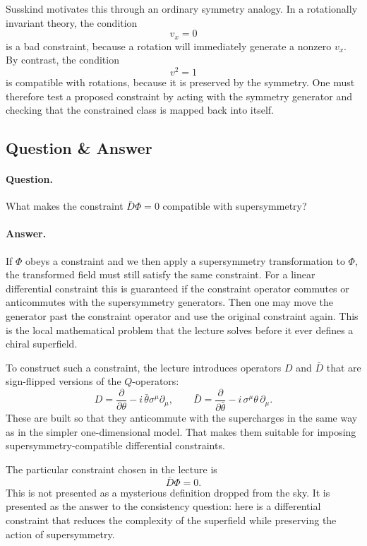 Susskind motivates this through an ordinary symmetry analogy. In a rotationally invariant theory, the condition
\[
v_x=0
\]
is a bad constraint, because a rotation will immediately generate a nonzero \(v_x\). By contrast, the condition
\[
v^2=1
\]
is compatible with rotations, because it is preserved by the symmetry. One must therefore test a proposed constraint by acting with the symmetry generator and checking that the constrained class is mapped back into itself.

\subsection{Question \& Answer}

\paragraph{Question.} What makes the constraint \(\bar D\Phi=0\) compatible with supersymmetry?

\paragraph{Answer.} If \(\Phi\) obeys a constraint and we then apply a supersymmetry transformation to \(\Phi\), the transformed field must still satisfy the same constraint. For a linear differential constraint this is guaranteed if the constraint operator commutes or anticommutes with the supersymmetry generators. Then one may move the generator past the constraint operator and use the original constraint again. This is the local mathematical problem that the lecture solves before it ever defines a chiral superfield.

To construct such a constraint, the lecture introduces operators \(D\) and \(\bar D\) that are sign-flipped versions of the \(Q\)-operators:
\begin{equation}
D=\frac{\partial}{\partial \theta}-i\,\bar\theta \sigma^\mu \partial_\mu,
\qquad
\bar D=\frac{\partial}{\partial \bar\theta}-i\,\sigma^\mu\theta\,\partial_\mu.
\end{equation}
These are built so that they anticommute with the supercharges in the same way as in the simpler one-dimensional model. That makes them suitable for imposing supersymmetry-compatible differential constraints.

The particular constraint chosen in the lecture is
\begin{equation}
\bar D\Phi=0.
\end{equation}
This is not presented as a mysterious definition dropped from the sky. It is presented as the answer to the consistency question: here is a differential constraint that reduces the complexity of the superfield while preserving the action of supersymmetry.

